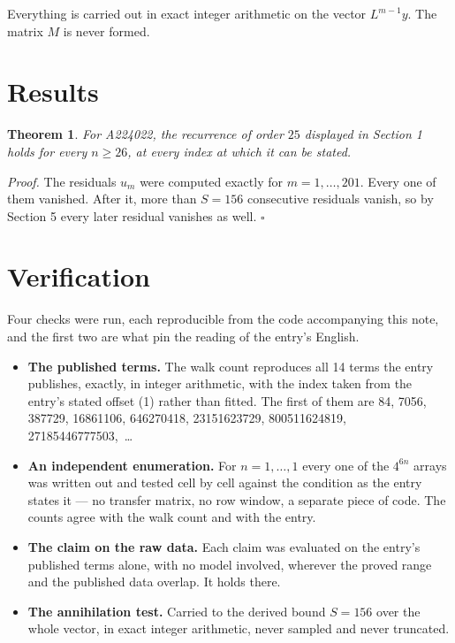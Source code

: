 \documentclass[11pt]{article}
\newtheorem{theorem}{Theorem}
\theoremstyle{definition}
\begin{document}
Everything is carried out in exact integer arithmetic on the vector $L^{m-1}y$. The matrix $M$ is never formed.

\section{Results}

\begin{theorem} For A224022, the recurrence of order $25$ displayed in Section 1 holds for every $n \ge 26$, at every index at which it can be stated.\end{theorem}

{\itshape Proof.} The residuals $u_m$ were computed exactly for $m = 1,\dots,201$. Every one of them vanished. After it, more than $S = 156$ consecutive residuals vanish, so by Section 5 every later residual vanishes as well. $\square$

\section{Verification}

Four checks were run, each reproducible from the code accompanying this note, and the first two are what pin the reading of the entry's English.

\begin{itemize}

\item {\bfseries The published terms.} The walk count reproduces all 14 terms the entry publishes, exactly, in integer arithmetic, with the index taken from the entry's stated offset (1) rather than fitted. The first of them are 84, 7056, 387729, 16861106, 646270418, 23151623729, 800511624819, 27185446777503,~\dots

\item {\bfseries An independent enumeration.} For $n = 1,\dots,1$ every one of the $4^{6n}$ arrays was written out and tested cell by cell against the condition as the entry states it --- no transfer matrix, no row window, a separate piece of code. The counts agree with the walk count and with the entry.

\item {\bfseries The claim on the raw data.} Each claim was evaluated on the entry's published terms alone, with no model involved, wherever the proved range and the published data overlap. It holds there.

\item {\bfseries The annihilation test.} Carried to the derived bound $S = 156$ over the whole vector, in exact integer arithmetic, never sampled and never truncated.

\end{itemize}
\end{document}
